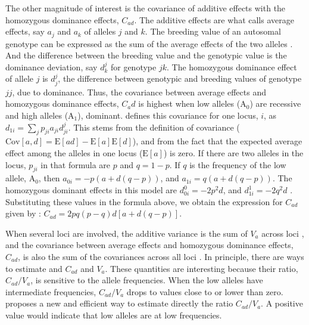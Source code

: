 \documentclass[a4paper,12pt]{article}
\begin{document}
The other magnitude of interest is the covariance of additive effects with the homozygous dominance effects, $C_{ad}$. The additive effects are what \citet[p. 112]{Falconer1989} calls average effects, say $a_j$ and $a_k$ of alleles $j$ and $k$. The breeding value of an autosomal genotype can be expressed as the sum of the average effects of the two alleles \citep[p.115]{Falconer1989}. And the difference between the breeding value and the genotypic value is the dominance deviation, say $d^j_k$ for genotype $jk$. The homozygous dominance effect of allele $j$ is $d^j_j$, the difference between genotypic and breeding values of genotype $jj$, due to dominance. Thus, the covariance between average effects and homozygous dominance effects, $C_ad$ is highest when low alleles (A$_0$) are recessive and high alleles (A$_1$), dominant. \citet{Cockerham1984} defines this covariance for one locus, $i$, as $d_{1i}=\sum_j p_{ji}a_{ji}d^j_{ji}$. This stems from the definition of covariance ($\mathrm{Cov}[a, d]=\mathrm{E}[ad] - \mathrm{E}[a]\mathrm{E}[d]$), and from the fact that the expected average effect among the alleles in one locus ($\mathrm{E}[a]$) is zero. If there are two alleles in the locus, $p_{ji}$ in that formula are $p$ and $q = 1-p$. If $q$ is the frequency of the low allele, A$_0$, then $a_{0i} = -p(a+d(q-p))$, and $a_{1i} = q(a+d(q-p))$. The homozygous dominant effects in this model are $d^0_{0i} = -2p^2d$, and $d^1_{1i}=-2q^2d$ \citep[p. 118]{Falconer1989}. Substituting these values in the formula above, we obtain the expression for $C_{ad}$ given by \citet{Kelly1999}: $C_{ad}=2pq(p-q)d[a+d(q-p)]$.

When several loci are involved, the additive variance is the sum of $V_a$ across loci \citep[p. 129]{Falconer1989}, and the covariance between average effects and homozygous dominance effects, $C_{ad}$, is also the sum of the covariances across all loci \citep{Cockerham1984}. In principle, there are ways to estimate and $C_{ad}$ and $V_a$. These quantities are interesting because their ratio, $C_{ad}/V_a$, is sensitive to the allele frequencies. When the low alleles have intermediate frequencies, $C_{ad}/V_a$ drops to values close to or lower than zero. \citet{Kelly1999} proposes a new and efficient way to estimate directly the ratio $C_{ad}/V_a$. A positive value would indicate that low alleles are at low frequencies. %




\end{document}
